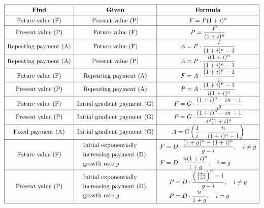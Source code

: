\[
\renewcommand{\arraystretch}{1.4}
\begin{array}{|c|c|c|}
\hline
\textbf{Find} & \textbf{Given} & \textbf{Formula} \\ \hline

\text{Future value (F)} & \text{Present value (P)} 
& F = P(1+i)^n \\ \hline

\text{Present value (P)} & \text{Future value (F)} 
& P = \dfrac{F}{(1+i)^n} \\ \hline

\text{Repeating payment (A)} & \text{Future value (F)} 
& A = F \cdot \dfrac{i}{(1+i)^n - 1} \\ \hline

\text{Repeating payment (A)} & \text{Present value (P)} 
& A = P \cdot \dfrac{i(1+i)^n}{(1+i)^n - 1} \\ \hline

\text{Future value (F)} & \text{Repeating payment (A)} 
& F = A \cdot \dfrac{(1+i)^n - 1}{i} \\ \hline

\text{Present value (P)} & \text{Repeating payment (A)} 
& P = A \cdot \dfrac{(1+i)^n - 1}{i(1+i)^n} \\ \hline

\text{Future value (F)} & \text{Initial gradient payment (G)} 
& F = G \cdot \dfrac{(1+i)^n - in - 1}{i^2} \\ \hline

\text{Present value (P)} & \text{Initial gradient payment (G)} 
& P = G \cdot \dfrac{(1+i)^n - in - 1}{i^2 (1+i)^n} \\ \hline

\text{Fixed payment (A)} & \text{Initial gradient payment (G)} 
& A = G \left( \dfrac{1}{i} - \dfrac{n}{(1+i)^n - 1} \right) \\ \hline

\text{Future value (F)} &
\begin{aligned}
&\text{Initial exponentially} \\
&\text{increasing payment (D),} \\
&\text{growth rate } g
\end{aligned}
&
\begin{aligned}
F &= D \cdot \dfrac{(1+g)^n - (1+i)^n}{g - i}, \quad i \neq g \\
F &= D \cdot \dfrac{n(1+i)^n}{1+g}, \quad i = g
\end{aligned}
\\ \hline

\text{Present value (P)} &
\begin{aligned}
&\text{Initial exponentially} \\
&\text{increasing payment (D),} \\
&\text{growth rate } g
\end{aligned}
&
\begin{aligned}
P &= D \cdot \dfrac{\left(\frac{1+g}{1+i}\right)^n - 1}{g - i}, \quad i \neq g \\
P &= D \cdot \dfrac{n}{1+g}, \quad i = g
\end{aligned}
\\ \hline

\end{array}
\]



